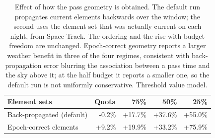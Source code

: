 \begin{table}[t]
\caption{Effect of how the pass geometry is obtained. The default run propagates current elements backwards over the window; the second uses the element set that was actually current on each night, from Space-Track. The ordering and the rise with budget freedom are unchanged. Epoch-correct geometry reports a larger weather benefit in three of the four regimes, consistent with back-propagation error blurring the association between a pass time and the sky above it; at the half budget it reports a smaller one, so the default run is not uniformly conservative. Threshold value model.}
\label{tab:histtle}
\centering
\setlength{\tabcolsep}{4pt}
\begin{tabular}{lrrrr}
\toprule
Element sets & Quota & 75\% & 50\% & 25\% \\
\midrule
Back-propagated (default) & -0.2\% & +17.7\% & +37.6\% & +55.0\% \\
Epoch-correct elements & +9.2\% & +19.9\% & +33.2\% & +75.9\% \\
\bottomrule
\end{tabular}
\end{table}
